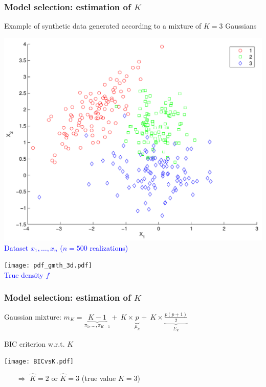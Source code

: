 \documentclass[compress, smaller, serif, 9pt]{beamer}
\begin{document}
\begin{frame}
   \frametitle{Model selection: estimation of $K$}

   \begin{block}{Example of synthetic data generated according to
   a mixture of $K=3$ Gaussians}
   \end{block}

\begin{minipage}{.49\textwidth}
\begin{center}
    \includegraphics[width=\textwidth]{Figs/S02/discr_analysis_ex.pdf}\\
    \textcolor{blue}{Dataset $x_1,\ldots,x_n$ ($n=500$ realizations)}
\end{center}
\end{minipage}
\hfill
\begin{minipage}{.49\textwidth}
\begin{center}
    \texttt{[image: pdf\_gmth\_3d.pdf]}\\
    \textcolor{blue}{True density $f$}
\end{center}
\end{minipage}
\end{frame}


\begin{frame}
   \frametitle{Model selection: estimation of $K$}
   \vspace{3mm}
{\small
    Gaussian mixture:
    $
      m_K=   \underbrace{K-1}_{\pi_1,\ldots,\pi_{K-1}}  + \  K \times  \underbrace{p}_{\mu_k}  + \  K  \times \underbrace{\frac{p(p+1)}{2}}_{\Sigma_k}
    $
    }   \vspace{-3mm}
   \begin{block}{BIC criterion w.r.t. $K$}
   \end{block}
\begin{center}
    \texttt{[image: BICvsK.pdf]}\\
\end{center}
\begin{itemize}
   \item[$\Rightarrow$] $\hat{K}=2$ or $\hat{K}=3$ (true value $K=3$)
\end{itemize}

\end{frame}
\end{document}
